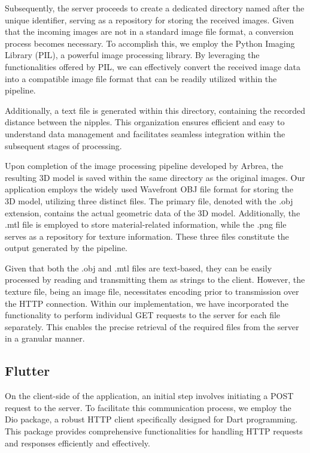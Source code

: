 Subsequently, the server proceeds to create a dedicated directory named after the unique identifier, serving as a repository for storing the received images. Given that the incoming 
images are not in a standard image file format, a conversion process becomes necessary. To accomplish this, we employ the Python Imaging Library (PIL), a powerful image processing library. 
By leveraging the functionalities offered by PIL, we can effectively convert the received image data into a compatible image file format that can be readily utilized within the pipeline. 

Additionally, a text file is generated within this directory, containing the recorded distance between the nipples. 
This organization ensures efficient and easy to understand data management and facilitates seamless integration within the subsequent stages of processing.

Upon completion of the image processing pipeline developed by Arbrea, the resulting 3D model is saved within the same directory as the original images. 
Our application employs the widely used Wavefront OBJ file format for storing the 3D model, utilizing three distinct files. The primary file, 
denoted with the .obj extension, contains the actual geometric data of the 3D model. Additionally, the .mtl file is employed to store material-related information, 
while the .png file serves as a repository for texture information. These three files constitute the output generated by the pipeline.

Given that both the .obj and .mtl files are text-based, they can be easily processed by reading and transmitting them as strings to the client. 
However, the texture file, being an image file, necessitates encoding prior to transmission over the HTTP connection. Within our implementation, 
we have incorporated the functionality to perform individual GET requests to the server for each file separately. This enables the 
precise retrieval of the required files from the server in a granular manner. 

\subsection{Flutter}

On the client-side of the application, an initial step involves initiating a POST request to the server. To facilitate this communication process, 
we employ the Dio package, a robust HTTP client specifically designed for Dart programming. This package provides comprehensive functionalities for 
handling HTTP requests and responses efficiently and effectively.

